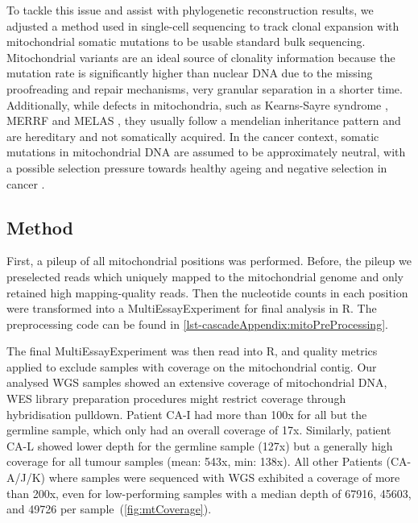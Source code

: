 To tackle this issue and assist with  phylogenetic reconstruction results, we adjusted a method used in single-cell sequencing to track clonal expansion with mitochondrial somatic mutations \cite{Ludwig2019} to be usable  standard bulk sequencing. Mitochondrial variants are an ideal source of clonality information because the mutation rate is significantly higher than nuclear DNA due to the missing proofreading and repair mechanisms,  very granular separation in a shorter time. Additionally, while  defects in mitochondria, such as Kearns-Sayre syndrome \cite{Harvey1992}, MERRF \cite{Adam1993} and MELAS \cite{Hirano1992}, they usually follow a mendelian inheritance pattern and are hereditary and not somatically acquired. In the cancer context, somatic mutations in mitochondrial DNA are assumed to be approximately neutral, with a possible selection pressure towards healthy ageing and negative selection in cancer \cite{Rodell2013,Yuan2020}.

\subsection{Method}
\label{cascade-sec:mitoMethod}

First, a pileup of all mitochondrial positions was performed. Before, the pileup we preselected reads which uniquely mapped to the mitochondrial genome and only retained high mapping-quality reads. Then the nucleotide counts in each position were transformed into a MultiEssayExperiment \cite{Ramos2017} for final analysis in R. The preprocessing code can be found in \autoref{lst-cascadeAppendix:mitoPreProcessing}.

The final MultiEssayExperiment was then read into R, and quality metrics applied to exclude samples with  coverage on the mitochondrial contig. Our analysed WGS samples showed an extensive coverage of mitochondrial DNA, WES library preparation procedures might restrict coverage through hybridisation pulldown. Patient CA-I had  more than 100x for all but the germline sample, which only had an overall coverage of 17x. Similarly, patient CA-L showed lower depth for the germline sample (127x) but a generally high coverage for all tumour samples (mean: 543x, min: 138x). All other Patients (CA-A/J/K) where samples were sequenced with WGS exhibited a coverage of more than 200x, even for low-performing samples with a median depth of \num{67916}, \num{45603}, and \num{49726} per sample~(\autoref{fig:mtCoverage}).

